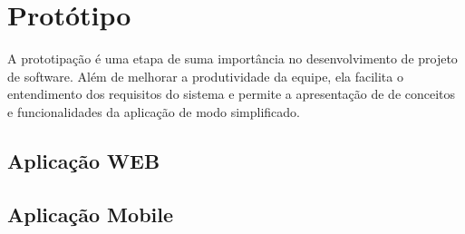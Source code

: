 \chapter{Protótipo}


A prototipação é uma etapa de suma importância no desenvolvimento de projeto de software. Além de melhorar a produtividade da equipe, ela facilita o entendimento dos requisitos do sistema e permite a apresentação de de conceitos e funcionalidades da aplicação de modo simplificado.

\section{Aplicação WEB}

\section{Aplicação Mobile}
